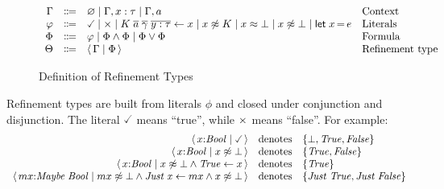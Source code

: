 \begin{figure}[htbp]
	\caption{Definition of Refinement Types}
	\label{fig:refinementTypes}
	\centering
	\[
		\begin{array}{rcll}
			\Gamma  & \Coloneqq & \varnothing \mid \Gamma, x:\tau \mid \Gamma, a                                                                                                  & \text{Context}         \\
			\varphi & \Coloneqq & \true \mid \false \mid \ctcon{\genconapp{K}{a}{\gamma}{y:\tau}}{x} \mid x \ntermeq K \mid x \termeq \bot \mid x \ntermeq \bot \mid \ctlet{x}{e} & \text{Literals}        \\
			\Phi    & \Coloneqq & \varphi \mid \Phi \wedge \Phi \mid \Phi \vee \Phi                                                                                               & \text{Formula}         \\
			\Theta  & \Coloneqq & \reft{\Gamma}{\Phi}                                                                                                                             & \text{Refinement type} \\
		\end{array}
	\]
\end{figure}

Refinement types are built from literals $\phi$ and closed under conjunction and disjunction.
The literal $\true$ means ``true'', while $\times$ means ``false''. For example:
$$
	\begin{array}{rcl}
		\reft{ x{:}\ensuremath{\Conid{Bool}}}{ \true }                                                                                                           & \text{denotes} & \{ \bot, \ensuremath{\Conid{True}}, \ensuremath{\Conid{False}} \}                       \\
		\reft{ x{:}\ensuremath{\Conid{Bool}}}{ x \ntermeq \bot }                                                                                                 & \text{denotes} & \{ \ensuremath{\Conid{True}}, \ensuremath{\Conid{False}} \}                             \\
		\reft{ x{:}\ensuremath{\Conid{Bool}}}{ x \ntermeq \bot \wedge \ctcon{\ensuremath{\Conid{True}}}{x} }                                                     & \text{denotes} & \{ \ensuremath{\Conid{True}} \}                                                         \\
		\reft{ mx{:}\ensuremath{\Conid{Maybe}\;\Conid{Bool}}}{ mx \ntermeq \bot \wedge \ctcon{\ensuremath{\Conid{Just}\;\Varid{x}}}{mx} \wedge x \ntermeq \bot } & \text{denotes} & \{ \ensuremath{\Conid{Just}\;\Conid{True}}, \ensuremath{\Conid{Just}\;\Conid{False}} \} \\
	\end{array}
$$

